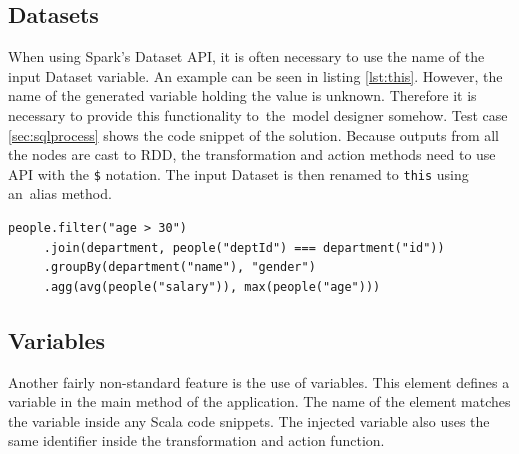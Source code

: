 \subsection*{Datasets}

When using Spark's Dataset API, it is often necessary to use the name of the input Dataset variable. An example can be seen in listing \ref{lst:this}. However, the name of the generated variable holding the value is unknown. Therefore it is necessary to provide this functionality to~the~model designer somehow. Test case \ref{sec:sqlprocess} shows the code snippet of the solution. Because outputs from all the nodes are cast to RDD, the transformation and action methods need to use API with the \texttt{\$} notation. The input Dataset is then renamed to \texttt{this} using an~alias method. 
\begin{lstlisting}[style=myScalastyle, caption={Dataset API using the name of Dataset variable}, label={lst:this}]
    people.filter("age > 30")
     .join(department, people("deptId") === department("id"))
     .groupBy(department("name"), "gender")
     .agg(avg(people("salary")), max(people("age")))
\end{lstlisting}


\subsection*{Variables}

Another fairly non-standard feature is the use of variables. This element defines a variable in the main method of the application. The name of the element matches the variable inside any Scala code snippets. The injected variable also uses the same identifier inside the transformation and action function. 


